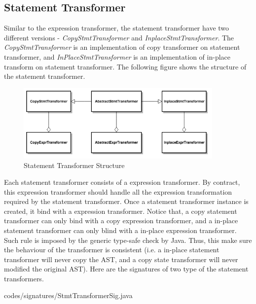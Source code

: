 \documentclass{comp621}
\begin{document}
\subsection{Statement Transformer}
Similar to the expression transformer, the statement transformer have two
different versions - \emph{CopyStmtTransformer} and
\emph{InplaceStmtTransformer}. The \emph{CopyStmtTransformer} is an
implementation of copy transformer on statement transformer, and
\emph{InPlaceStmtTransformer} is an implementation of in-place transform on
statement transformer. The following figure shows the structure of the
statement transformer.

\begin{figure}[!htbp]
    \begin{center}
    \includegraphics[width=0.9\textwidth]
                    {figures/statement_transformer_structure}
    \end{center}
    \caption{Statement Transformer Structure}
\end{figure}

Each statement transformer consists of a expression transformer. By contract,
this expression transformer should handle all the expression transformation
required by the statement transformer. Once a statement transformer instance is
created, it bind with a expression transformer. Notice that, a copy statement
transformer can only bind with a copy expression transformer, and a in-place
statement transformer can only blind with a in-place expression transformer.
Such rule is imposed by the generic type-safe check by Java. Thus, this make
sure the behaviour of the transformer is consistent (i.e. a in-place statement
transformer will never copy the AST, and a copy state transformer will never
modified the original AST). Here are the signatures of two type of the
statement transformers.


                {codes/signatures/StmtTransformerSig.java}
\end{document}
